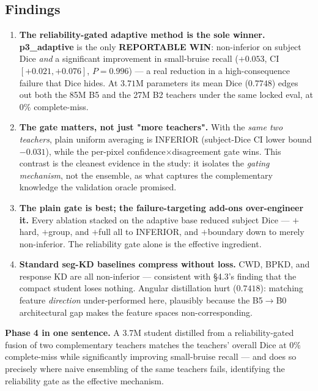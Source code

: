 \documentclass[11pt]{article}
\newcommand{\win}[1]{\textcolor{wingreen}{\textbf{#1}}}
\newcommand{\lose}[1]{\textcolor{losered}{#1}}
\begin{document}
\subsection{Findings}

\begin{enumerate}[leftmargin=1.6em,itemsep=4pt]
  \item \textbf{The reliability-gated adaptive method is the sole winner.} \win{p3\_adaptive} is
  the only \textbf{REPORTABLE WIN}: non-inferior on subject Dice \emph{and} a significant
  improvement in small-bruise recall ($+0.053$, CI $[+0.021,+0.076]$, $P=0.996$) --- a real
  reduction in a high-consequence failure that Dice hides. At $3.71$M parameters its mean Dice
  ($0.7748$) edges out both the 85M B5 and the 27M B2 teachers under the same locked eval, at
  $0\%$ complete-miss.

  \item \textbf{The gate matters, not just "more teachers".} With the \emph{same two teachers},
  plain uniform averaging is \lose{INFERIOR} (subject-Dice CI lower bound $-0.031$), while the
  per-pixel confidence$\times$disagreement gate wins. This contrast is the cleanest evidence in
  the study: it isolates the \emph{gating mechanism}, not the ensemble, as what captures the
  complementary knowledge the validation oracle promised.

  \item \textbf{The plain gate is best; the failure-targeting add-ons over-engineer it.} Every
  ablation stacked on the adaptive base reduced subject Dice --- \lose{$+$hard}, \lose{$+$group},
  and \lose{$+$full} all to INFERIOR, and $+$boundary down to merely non-inferior. The reliability
  gate alone is the effective ingredient.

  \item \textbf{Standard seg-KD baselines compress without loss.} CWD, BPKD, and response KD are
  all non-inferior --- consistent with \S4.3's finding that the compact student loses nothing.
  Angular distillation \lose{hurt} ($0.7418$): matching feature \emph{direction} under-performed
  here, plausibly because the B5$\to$B0 architectural gap makes the feature spaces
  non-corresponding.
\end{enumerate}

\begin{keybox}
\textbf{Phase 4 in one sentence.} A 3.7M student distilled from a reliability-gated fusion of two
complementary teachers matches the teachers' overall Dice at $0\%$ complete-miss while
significantly improving small-bruise recall --- and does so precisely where naive ensembling of
the same teachers fails, identifying the reliability gate as the effective mechanism.
\end{keybox}
\end{document}
